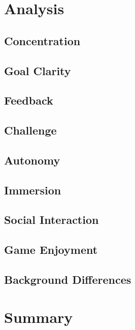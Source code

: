 \section{Analysis}
\subsection{Concentration}
\subsection{Goal Clarity}
\subsection{Feedback}
\subsection{Challenge}
\subsection{Autonomy}
\subsection{Immersion}
\subsection{Social Interaction}
\subsection{Game Enjoyment}
\subsection{Background Differences}

\section{Summary}
